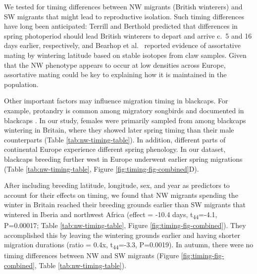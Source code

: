 \documentclass[a4paper, nobind]{templates/ociamthesis}
\begin{document}
We tested for timing differences between NW migrants (British winterers) and SW migrants that might lead to reproductive isolation.
Such timing differences have long been anticipated: Terrill and Berthold \autocite*{terrillEcophysiologicalAspectsRapid1990} predicted that differences in spring photoperiod should lead British winterers to depart and arrive c.~5 and 16 days earlier, respectively, and Bearhop et al.~\autocite*{bearhopAssortativeMatingMechanism2005} reported evidence of assortative mating by wintering latitude based on stable isotopes from claw samples.
Given that the NW phenotype appears to occur at low densities across Europe, assortative mating could be key to explaining how it is maintained in the population.

Other important factors may influence migration timing in blackcaps.
For example, protandry is common among migratory songbirds and documented in blackcaps \autocite{rainioEffectsClimateChange2007}.
In our study, females were primarily sampled from among blackcaps wintering in Britain, where they showed later spring timing than their male counterparts (Table \ref{tab:nw-timing-table}).
In addition, different parts of continental Europe experience different spring phenology.
In our dataset, blackcaps breeding further west in Europe underwent earlier spring migrations (Table \ref{tab:nw-timing-table}, Figure \ref{fig:timing-fig-combined}D).

After including breeding latitude, longitude, sex, and year as predictors to account for their effects on timing, we found that NW migrants spending the winter in Britain reached their breeding grounds earlier than SW migrants that wintered in Iberia and northwest Africa (effect = -10.4 days, t\textsubscript{44}=-4.1, P=0.00017; Table \ref{tab:nw-timing-table}, Figure \ref{fig:timing-fig-combined}).
They accomplished this by leaving the wintering grounds earlier
\autocite[effect = -6.1 days, t\textsubscript{43}=-2.5, P=0.018; compare][]{terrillEcophysiologicalAspectsRapid1990} and having shorter migration durations (ratio = 0.4x, t\textsubscript{44}=-3.3, P=0.0019).
In autumn, there were no timing differences between NW and SW migrants (Figure \ref{fig:timing-fig-combined}, Table \ref{tab:nw-timing-table}).
\end{document}
